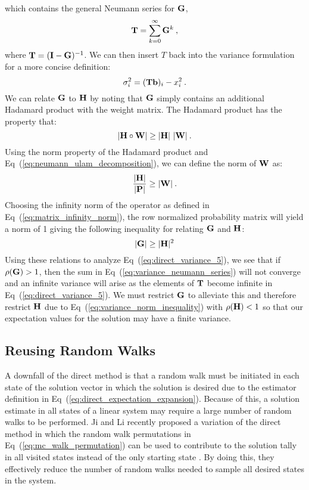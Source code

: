 which contains the general Neumann series for $\mathbf{G}$,
\begin{equation}
  \mathbf{T} = \sum_{k=0}^{\infty} \mathbf{G}^k\:,
  \label{eq:variance_neumann_series}
\end{equation}
where $\mathbf{T} = (\mathbf{I}-\mathbf{G})^{-1}$. We can then insert $T$ back
into the variance formulation for a more concise definition:
\begin{equation}
  \sigma^2_i = (\mathbf{T}\mathbf{b})_i - x_i^2\:.
  \label{eq:direct_variance_5}
\end{equation}
We can relate $\mathbf{G}$ to $\mathbf{H}$ by noting that $\mathbf{G}$ simply
contains an additional Hadamard product with the weight matrix. The
Hadamard product has the property that:
\begin{equation}
  |\mathbf{H} \circ \mathbf{W}| \geq |\mathbf{H}|\ |\mathbf{W}|\:.
  \label{eq:hadamard_inequality}
\end{equation}
Using the norm property of the Hadamard product and
Eq~(\ref{eq:neumann_ulam_decomposition}), we can define the norm of
$\mathbf{W}$ as:
\begin{equation}
  \frac{|\mathbf{H}|}{|\mathbf{P}|} \geq |\mathbf{W}|\:.
  \label{eq:weight_norm}
\end{equation}
Choosing the infinity norm of the operator as defined in
Eq~(\ref{eq:matrix_infinity_norm}), the row normalized probability
matrix will yield a norm of 1 giving the following inequality for
relating $\mathbf{G}$ and $\mathbf{H}$:
\begin{equation}
  |\mathbf{G}| \geq |\mathbf{H}|^2
  \label{eq:variance_norm_inequality}
\end{equation}
Using these relations to analyze Eq~(\ref{eq:direct_variance_5}), we
see that if $\rho(\mathbf{G}) > 1$, then the sum in
Eq~(\ref{eq:variance_neumann_series}) will not converge and an
infinite variance will arise as the elements of $\mathbf{T}$ become
infinite in Eq~(\ref{eq:direct_variance_5}). We must restrict $\mathbf{G}$
to alleviate this and therefore restrict $\mathbf{H}$ due to
Eq~(\ref{eq:variance_norm_inequality}) with $\rho(\mathbf{H}) < 1$ so that
our expectation values for the solution may have a finite variance.

\subsection{Reusing Random Walks}
\label{subsec:reusing_random_walks}
A downfall of the direct method is that a random walk must be
initiated in each state of the solution vector in which the solution
is desired due to the estimator definition in
Eq~(\ref{eq:direct_expectation_expansion}). Because of this, a
solution estimate in all states of a linear system may require a
large number of random walks to be performed. Ji and Li recently
proposed a variation of the direct method in which the random walk
permutations in Eq~(\ref{eq:mc_walk_permutation}) can be used to
contribute to the solution tally in all visited states instead of the
only starting state \citep{ji_reusing_2012}. By doing this, they
effectively reduce the number of random walks needed to sample all
desired states in the system.

